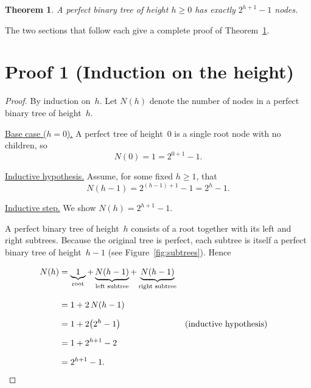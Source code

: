 \documentclass[12pt]{article}
\theoremstyle{definition}
\theoremstyle{plain}
\newtheorem{theorem}{Theorem}
\begin{document}
\begin{theorem}\label{thm:main}
A perfect binary tree of height $h \geq 0$ has exactly\/ $2^{h+1}-1$
nodes.
\end{theorem}

The two sections that follow each give a complete proof of
Theorem~\ref{thm:main}.

\section{Proof 1 \textnormal{(Induction on the height)}}

\begin{proof}
By induction on~$h$.  Let $N(h)$ denote the number of nodes in a
perfect binary tree of height~$h$.

\medskip
\noindent\underline{Base case ($h=0$).}\quad
A perfect tree of height~$0$ is a single root node with no children,
so
\[
  N(0)=1=2^{0+1}-1.
\]

\noindent\underline{Inductive hypothesis.}\quad
Assume, for some fixed $h\ge1$, that
\[
  N(h-1)=2^{(h-1)+1}-1=2^{h}-1.
\]

\noindent\underline{Inductive step.}\quad
We show $N(h)=2^{h+1}-1$.

\smallskip
\noindent
A perfect binary tree of height~$h$ consists of a root together with
its left and right subtrees.  Because the original tree is perfect,
each subtree is itself a perfect binary tree of height~$h-1$
(see Figure~\ref{fig:subtrees}).  Hence

\begin{align*}
N(h)
  &= \underbrace{1}_{\text{root}}
   + \underbrace{N(h-1)}_{\text{left subtree}}
   + \underbrace{N(h-1)}_{\text{right subtree}} \\[8pt]
  &= 1 + 2\,N(h-1)                              \\[6pt]
  &= 1 + 2\!\left(2^{h}-1\right)
     &&\text{(inductive hypothesis)}             \\[6pt]
  &= 1 + 2^{h+1} - 2                            \\[6pt]
  &= 2^{h+1} - 1.\qedhere
\end{align*}
\end{proof}
\end{document}
